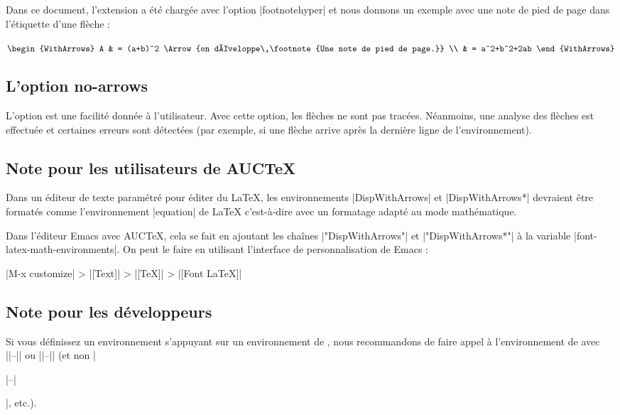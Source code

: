 \documentclass[dvipsnames]{article}%
\begin{document}
\medskip
Dans ce document, l'extension  a été chargée avec l'option |footnotehyper|
et nous donnons un exemple avec une note de pied de page dans l'étiquette d'une flèche :


\smallskip
$\begin{WithArrows}
A & = (a+b)^2 
\Arrow{on développe\,\footnote{Une note de pied de page.}} \\
   & = a^2+b^2+2ab
\end{WithArrows}$

\bigskip
\subsection{L'option no-arrows}

L'option  est une facilité donnée à l'utilisateur. Avec cette
option, les flèches ne sont pas tracées. Néanmoins, une analyse des flèches est effectuée
et certaines erreurs sont détectées (par exemple, si une flèche arrive après la dernière
ligne de l'environnement).


\bigskip
\subsection{Note pour les utilisateurs de AUCTeX}

Dans un éditeur de texte paramétré pour éditer du LaTeX, les environnements
|{DispWithArrows}| et |{DispWithArrows*}| devraient être formatés comme l'environnement
|{equation}| de LaTeX c'est-à-dire avec un formatage adapté au mode mathématique.

Dans l'éditeur Emacs avec AUCTeX, cela se fait en ajoutant les chaînes |"DispWithArrows"|
et |"DispWithArrows*"| à la variable |font-latex-math-environments|. On peut le faire en
utilisant l'interface de personnalisation de Emacs :

|M-x customize| > |[Text]| > |[TeX]| > |[Font LaTeX]|

\bigskip
\subsection{Note pour les développeurs}

Si vous définissez un environnement s'appuyant sur un environnement de 
, nous recommandons de faire appel à l'environnement de  avec 
|\WithArrows|--|\endWithArrows| ou |\DispWithArrows|--|\endDispWithArrows| (et
non |\begin{WithArrows}|--|\end{WithArrows}|, etc.).
\end{document}
